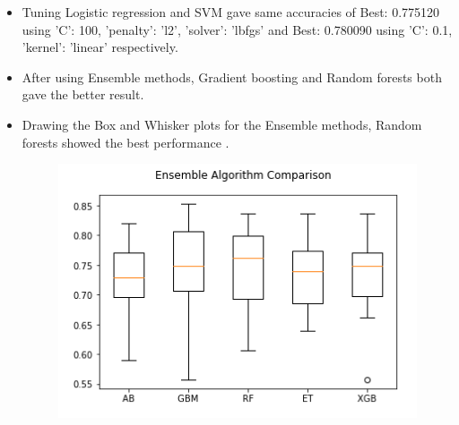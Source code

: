 \documentclass[11pt]{article}
\begin{document}
\begin{itemize}
	\item Tuning Logistic regression and SVM gave same accuracies of Best: 0.775120 using {'C': 100, 'penalty': 'l2', 'solver': 'lbfgs'} and Best: 0.780090 using {'C': 0.1, 'kernel': 'linear'} respectively.\\
	
	\item After using Ensemble methods, Gradient boosting and Random forests both gave the better result.\\
	
	\item Drawing the Box and Whisker plots for the Ensemble methods, Random forests showed the best performance .\\
	
	\begin{figure}[h]
		\centerline{\small 
			\includegraphics[height=0.2\textheight]  {y4}}
	\end{figure}
	
	
	
\end{itemize}
\end{document}
